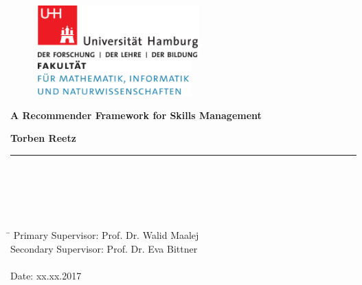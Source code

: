 \begin{titlepage}

  \setcounter{page}{-1}

	\begin{figure}[h]
		\begin{minipage}[b]{62mm}
			\includegraphics[width=62mm]{images/unilogo}
		\end{minipage}
		\hspace{4cm}
		\begin{minipage}[b]{59mm}
			\includegraphics[width=59mm]{images/minlogo}
		\end{minipage}
	\end{figure}

	\vfill

	\begin{center}
		\vspace{14mm}
		\noindent \textbf{\huge
		A Recommender Framework for Skills Management \\
		}
		\vspace{14mm}
	\end{center}

	\vfill

	\noindent \textbf{Torben Reetz} \\
	\noindent \rule{\textwidth}{0.4mm}
	 \\
	 \\
	 \\
	 \\
	\begin{tabbing}
	\hspace{8em} \=  \kill
	Primary Supervisor: Prof. Dr. Walid Maalej \\
	Secondary Supervisor: Prof. Dr. Eva Bittner \\
	~ \\
	Date: xx.xx.2017
	\end{tabbing}


\end{titlepage}
